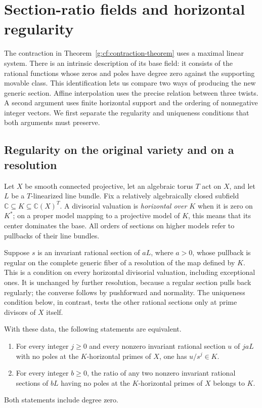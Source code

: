 \section{Section-ratio fields and horizontal regularity}
\label{g:cf:fields}

The contraction in Theorem~\ref{g:cf:contraction-theorem} uses a
maximal linear system. There is an
intrinsic description of its base field: it consists of the rational
functions whose zeros and poles have degree zero against the supporting
movable class. This identification lets us compare two ways of producing
the new generic section. Affine interpolation uses the precise relation
between three twists. A second argument uses finite horizontal support
and the ordering of nonnegative integer vectors. We first separate the
regularity and uniqueness conditions that both arguments must preserve.

\subsection{Regularity on the original variety and on a resolution}
\label{g:cf:conditions}

Let $X$ be smooth connected projective, let an algebraic torus $T$ act on
$X$, and let $L$ be a $T$-linearized line bundle. Fix a relatively
algebraically closed subfield
$\mathbb C\subseteq K\subseteq\mathbb C(X)^T$. A divisorial valuation is
\emph{horizontal over $K$} when it is zero on $K^*$; on a proper model
mapping to a projective model of $K$, this means that its center dominates
the base. All orders of sections on higher models refer to pullbacks of
their line bundles.

Suppose $s$ is an invariant rational section of $aL$, where $a>0$, whose
pullback is regular on the complete generic fiber of a resolution of the
map defined by $K$. This is a condition on every horizontal divisorial
valuation, including exceptional ones. It is unchanged by further
resolution, because a regular section pulls back regularly; the converse
follows by pushforward and normality. The uniqueness condition below,
in contrast, tests the other rational sections only at prime divisors of
$X$ itself.

\begin{lemma}
\label{g:cf:uniqueness}
With these data, the following statements are equivalent.
\begin{enumerate}
\item For every integer $j\geq0$ and every nonzero invariant rational
section $u$ of $jaL$ with no poles at the $K$-horizontal primes of $X$,
one has $u/s^j\in K$.
\item For every integer $b\geq0$, the ratio of any two nonzero invariant
rational sections of $bL$ having no poles at the $K$-horizontal primes of
$X$ belongs to $K$.
\end{enumerate}
Both statements include degree zero.
\end{lemma}

